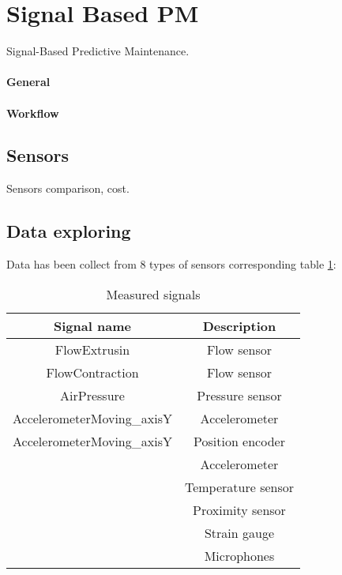 \documentclass[class=article, crop=false]{standalone}
\begin{document}
\tableofcontents



\section{Signal Based PM}
Signal-Based Predictive Maintenance.
\paragraph{General}
\paragraph{Workflow}


\subsection{Sensors}
Sensors comparison, cost.

\subsection{Data exploring}
Data has been collect from 8 types of sensors corresponding table
\ref{tab:measured_signals}:
\begin{table}[h]
    \centering
    \begin{tabular}{|c|c|}
        \hline
        Signal name                   &   Description       \\     
               \hline
           FlowExtrusin               &   Flow sensor       \\
           FlowContraction            &   Flow sensor       \\
           AirPressure                &   Pressure sensor   \\
           AccelerometerMoving\_axisY &   Accelerometer     \\
           AccelerometerMoving\_axisY &   Position encoder  \\
                                      &   Accelerometer     \\
                                      &   Temperature sensor\\
                                      &   Proximity sensor  \\
                                      &   Strain gauge      \\ 
                                      &   Microphones       \\ 
        \hline
    \end{tabular}
    \caption{Measured signals}
    \label{tab:measured_signals}
\end{table}
\end{document}
